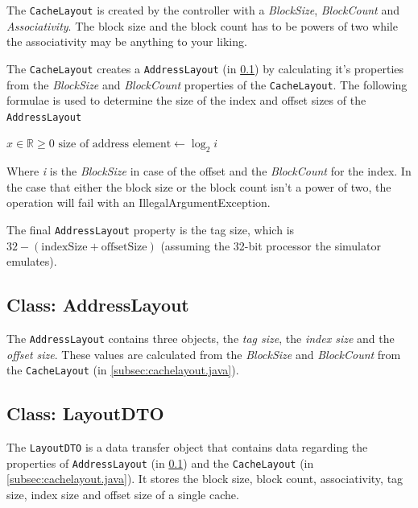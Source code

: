 \documentclass[a4paper]{scrreprt}
\begin{document}
The \texttt{CacheLayout} is created by the controller with a \textit{BlockSize}, \textit{BlockCount} and \textit{Associativity}. The block size and the block count has to be powers of two while the associativity may be anything to your liking.

The \texttt{CacheLayout} creates a \texttt{AddressLayout} (in \ref{subsec:addresslayout.java}) by calculating it's properties from the \textit{BlockSize} and \textit{BlockCount} properties of the \texttt{CacheLayout}.
The following formulae is used to determine the size of the index and offset sizes of the \texttt{AddressLayout}

\begin{algorithmic}
\State $x \in \mathbb{R} \geq 0$ 
    \State $\text{size of address element} \gets \log _2 i$ 
\EndIf
\end{algorithmic}

Where \textit{i} is the \textit{BlockSize} in case of the offset and the \textit{BlockCount} for the index. In the case that either the block size or the block count isn't a power of two, the operation will fail with an IllegalArgumentException.

The final \texttt{AddressLayout} property is the tag size, which is $32 - (\text{indexSize} + \text{offsetSize})$ (assuming the 32-bit processor the simulator emulates).



\subsection{Class: AddressLayout}
\label{subsec:addresslayout.java}

The \texttt{AddressLayout} contains three objects, the \textit{tag size}, the \textit{index size} and the \textit{offset size}. These values are calculated from the \textit{BlockSize} and \textit{BlockCount} from the \texttt{CacheLayout} (in \ref{subsec:cachelayout.java}).



\subsection{Class: LayoutDTO}
\label{subsec:layoutdto.java}

The \texttt{LayoutDTO} is a data transfer object that contains data regarding the properties of \texttt{AddressLayout} (in \ref{subsec:addresslayout.java}) and the \texttt{CacheLayout} (in \ref{subsec:cachelayout.java}). It stores the block size, block count, associativity, tag size, index size and offset size of a single cache.
\end{document}
